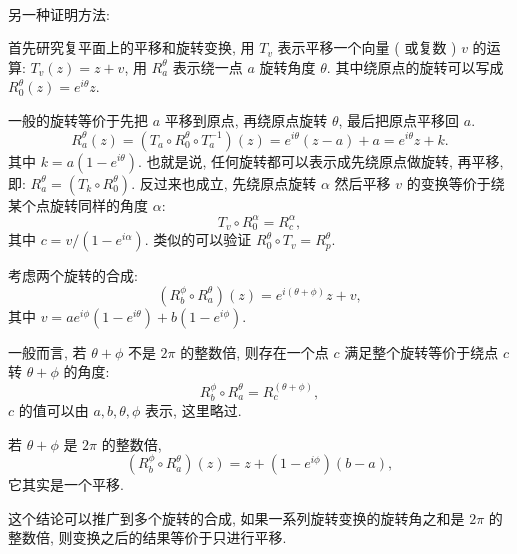 ~

\noindent 另一种证明方法:

首先研究复平面上的平移和旋转变换, 用 $ T_v $ 表示平移一个向量 ( 或复数 ) $ v $ 的运算: $ T_v(z) = z + v $, 用 $ R_a^\theta $ 表示绕一点 $ a $ 旋转角度 $ \theta $. 其中绕原点的旋转可以写成 $ R_0^\theta(z) = e^{i\theta}z $.

一般的旋转等价于先把 $ a $ 平移到原点, 再绕原点旋转 $ \theta $, 最后把原点平移回 $ a $.
\[ R_a^\theta(z) = (T_a\circ R_0^\theta \circ T_a^{-1})(z) = e^{i\theta}(z-a)+a = e^{i\theta}z+k .\]
其中 $ k = a(1-e^{i\theta}) $. 也就是说, 任何旋转都可以表示成先绕原点做旋转, 再平移, 即: $ R_a^\theta = (T_k\circ R_0^\theta) $. 反过来也成立, 先绕原点旋转 $ \alpha $ 然后平移 $ v $ 的变换等价于绕某个点旋转同样的角度 $ \alpha $: 
\[ T_v \circ R_0^\alpha=R_c^\alpha ,\]
其中 $ c = v/(1-e^{i\alpha}) $. 类似的可以验证 $ R_0^\theta \circ T_v = R_p^\theta $.

考虑两个旋转的合成: 
\[ (R_b^\phi \circ R_a^\theta) (z) = e^{i(\theta+\phi)}z + v ,\]
其中 $ v = ae^{i\phi}(1-e^{i\theta})+b(1-e^{i\phi}) $.

一般而言, 若 $ \theta + \phi $ 不是 $ 2\pi $ 的整数倍, 则存在一个点 $ c $ 满足整个旋转等价于绕点 $ c $ 转 $ \theta + \phi $ 的角度:
\[ R_b^\phi \circ R_a^\theta = R_c^{(\theta+\phi)}, \]
$ c $ 的值可以由 $ a, b, \theta, \phi $ 表示, 这里略过.

若 $ \theta + \phi $ 是 $ 2\pi $ 的整数倍, 
\[ (R_b^\phi \circ R_a^\theta) (z) = z + (1-e^{i\phi})(b-a) ,\]
它其实是一个平移.

这个结论可以推广到多个旋转的合成, 如果一系列旋转变换的旋转角之和是 $ 2\pi $ 的整数倍, 则变换之后的结果等价于只进行平移.

